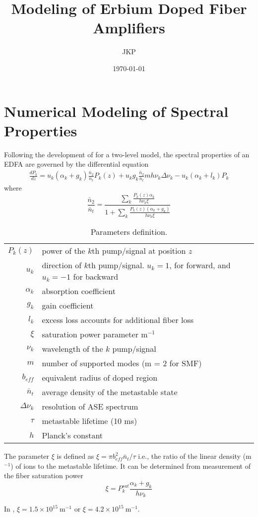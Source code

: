 \documentclass[a4paper]{article}
\title{Modeling of Erbium Doped Fiber Amplifiers}
\author{JKP}
\date{\today}
\begin{document}
\maketitle

\section{Numerical Modeling of Spectral Properties}

Following the development of \cite{Giles1991} for a two-level model, the spectral properties of an EDFA are governed by the differential equation
\begin{align}
\frac{dP_k}{dz} = u_k(\alpha_k + g_k)\frac{\bar{n}_2}{\bar{n}_t}P_k(z) + u_kg_k\frac{\bar{n}_2}{\bar{n}_t}mh\nu_k\Delta\nu_k - u_k(\alpha_k + l_k)P_k
\end{align}
where
\begin{equation}
\frac{\bar{n}_2}{\bar{n}_t} = \frac{\sum_k \frac{P_k(z)\alpha_k}{h\nu_k\xi}}{1 + \sum_k \frac{P_k(z)(\alpha_k + g_k)}{h\nu_k\xi}}
\end{equation}

\begin{table}[h]
	\caption{Parameters definition.}
	\label{tab:param}
	\centering
	\begin{tabular}{r|l}
		\hline
		$P_k(z)$ & power of the $k$th pump/signal at position $z$ \\
		$u_k$ & direction of $k$th pump/signal. $u_k = 1$, for forward, and $u_k = -1$ for backward \\
		$\alpha_k$ & absorption coefficient \\
		$g_k$ & gain coefficient \\
		$l_k$ & excess loss accounts for additional fiber loss \\
		$\xi$ & saturation power parameter $\mathrm{m}^{-1}$ \\
		$\nu_k$ & wavelength of the $k$ pump/signal \\
		$m$ & number of supported modes (m = 2 for SMF)\\
		$b_{eff}$ & equivalent radius of doped region \\
		$\bar{n}_t$ & average density of the metastable state \\
		$\Delta\nu_k$ & resolution of ASE spectrum \\
		$\tau$ & metastable lifetime (10 ms) \\
		$h$ & Planck's constant \\
		\hline
	\end{tabular}
\end{table}

The parameter $\xi$ is defined as $\xi = \pi b_{eff}^2\bar{n}_t/\tau$ i.e., the ratio of the linear density (m$^{-1}$) of ions to the metastable lifetime. It can be determined from measurement of the fiber saturation power 
\begin{equation}
\xi = P^{sat}_k\frac{\alpha_k+g_k}{h\nu_k}
\end{equation}

In \cite{Giles1991}, $\xi = 1.5\times10^{15}~\mathrm{m}^{-1}$ or  $\xi = 4.2\times10^{15}~\mathrm{m}^{-1}$.



\end{document}
